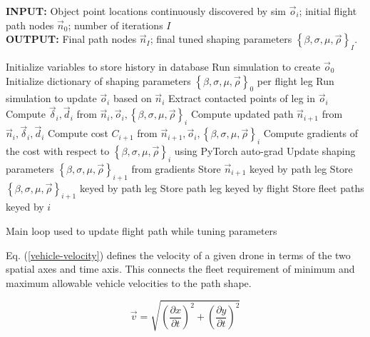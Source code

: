 \documentclass[conf]{new-aiaa}
\begin{document}
\begin{algorithm}
\textbf{INPUT:} Object point locations continuously discovered by sim $\vec{o}_i$; initial flight path nodes $\vec{n}_0$; number of iterations $I$\\
\textbf{OUTPUT:} Final path nodes $\vec{n}_I$; final tuned shaping parameters $\left\{\beta, \sigma, \mu, \vec{\rho}\right\}_I$.
\begin{algorithmic}
\STATE Initialize variables to store history in database
\STATE Run simulation to create $\vec{o}_0$
\STATE Initialize dictionary of shaping parameters $\left\{\beta, \sigma, \mu, \vec{\rho}\right\}_0$ per flight leg
\STATE Run simulation to update $\vec{o}_i$ based on $\vec{n}_i$
\STATE Extract contacted points of leg in $\vec{o}_i$
\STATE Compute $\vec{\delta}_i, \vec{d}_i$ from $\vec{n}_i, \vec{o}_i, \left\{\beta, \sigma, \mu, \vec{\rho}\right\}_i$
\STATE Compute updated path $\vec{n}_{i + 1}$ from $\vec{n}_i, \vec{\delta}_i, \vec{d}_i$
\STATE Compute cost $C_{i + 1}$ from $\vec{n}_{i + 1}, \vec{o}_i, \left\{\beta, \sigma, \mu, \vec{\rho}\right\}_i$
\STATE Compute gradients of the cost with respect to $\left\{\beta, \sigma, \mu, \vec{\rho}\right\}_i$ using PyTorch auto-grad
\STATE Update shaping parameters $\left\{\beta, \sigma, \mu, \vec{\rho}\right\}_{i + 1}$ from gradients
\ENDIF
\STATE Store $\vec{n}_{i + 1}$ keyed by path leg
\STATE Store $\left\{\beta, \sigma, \mu, \vec{\rho}\right\}_{i + 1}$ keyed by path leg
\ENDFOR
\STATE Store path leg keyed by flight
\ENDFOR
\STATE Store fleet paths keyed by $i$
\ENDFOR
\end{algorithmic}
\caption{Main loop used to update flight path while tuning parameters}
\label{algo:relgraph}
\end{algorithm}

Eq. (\ref{vehicle-velocity}) defines the velocity of a given drone in terms of the two spatial axes and time axis. This connects the fleet requirement of minimum and maximum allowable vehicle velocities to the path shape.

\begin{equation}
\label{vehicle-velocity}
\vec{v} = \sqrt{\left(\frac{\partial{x}}{\partial{t}}\right)^2 + \left(\frac{\partial{y}}{\partial{t}}\right)^2}
\end{equation}
\end{document}
